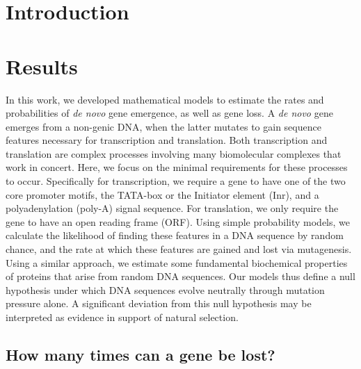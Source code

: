 \documentclass[12pt,a4paper]{article}
\begin{document}
\onehalfspacing

\section{Introduction}

\section{Results}

In this work, we developed mathematical models to estimate the rates and probabilities of \textit{de novo} gene emergence, as well as gene loss. A \textit{de novo} gene emerges from a non-genic DNA, when the latter mutates to gain sequence features necessary for transcription and translation. Both transcription and translation are complex processes involving many biomolecular complexes that work in concert. Here, we focus on the minimal requirements for these processes to occur. Specifically for transcription, we require a gene to have one of the two core promoter motifs, the TATA-box or the Initiator element (Inr), and a polyadenylation (poly-A) signal sequence. For translation, we only require the gene to have an open reading frame (ORF). Using simple probability models, we calculate the likelihood of finding these features in a DNA sequence by random chance, and the rate at which these features are gained and lost via mutagenesis. Using a similar approach, we estimate some fundamental biochemical properties of proteins that arise from random DNA sequences. Our models thus define a null hypothesis under which DNA sequences evolve neutrally through mutation pressure alone. A significant deviation from this null hypothesis may be interpreted as evidence in support of natural selection. 

\subsection{How many times can a gene be lost?}
\end{document}
